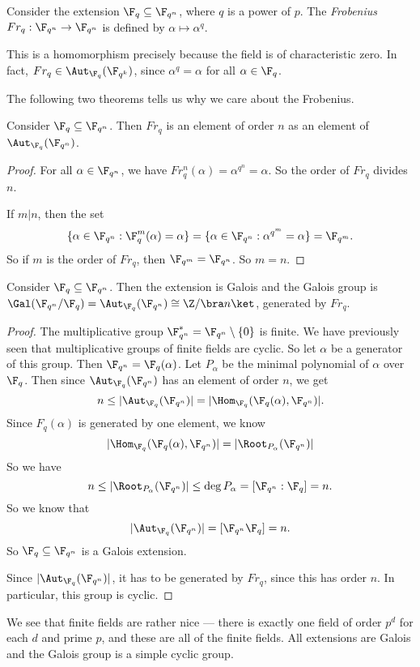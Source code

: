 \documentclass[a4paper]{article}
\begin{document}
\begin{defi}
  Consider the extension $\F_q \subseteq \F_{q^n}$, where $q$ is a power of $p$. The \emph{Frobenius} $Fr_q: \F_{q^n} \to \F_{q^n}$ is defined by $\alpha\mapsto \alpha^q$.
\end{defi}
This is a homomorphism precisely because the field is of characteristic zero. In fact, $Fr_q \in \Aut_{\F_q} (\F_{q^k})$, since $\alpha^q = \alpha$ for all $\alpha \in \F_q$.

The following two theorems tells us why we care about the Frobenius.
\begin{thm}[]
  Consider $\F_q \subseteq \F_{q^n}$. Then $Fr_q$ is an element of order $n$ as an element of $\Aut_{\F_q}(\F_{q^n})$.
\end{thm}

\begin{proof}
  For all $\alpha \in \F_{q^n}$, we have $Fr_q^n (\alpha) = \alpha^{q^n} = \alpha$. So the order of $Fr_q$ divides $n$.

  If $m | n$, then the set
  \[
    \{\alpha \in \F_{q^n} : \F_q^m (\alpha) = \alpha\} = \{\alpha \in \F_{q^n}: \alpha^{q^m} = \alpha\} = \F_{q^m}.
  \]
  So if $m$ is the order of $Fr_q$, then $\F_{q^m} = \F_{q^n}$. So $m = n$.
\end{proof}

\begin{thm}[]
  Consider $\F_q \subseteq \F_{q^n}$. Then the extension is Galois and the Galois group is $\Gal(\F_{q^n}/\F_q) = \Aut_{\F_q}(\F_{q^n}) \cong \Z/\bra n\ket$, generated by $Fr_q$.
\end{thm}

\begin{proof}
  The multiplicative group $\F_{q^n}^* = \F_{q^n} \setminus \{0\}$ is finite. We have previously seen that multiplicative groups of finite fields are cyclic. So let $\alpha$ be a generator of this group. Then $\F_{q^n} = \F_q(\alpha)$. Let $P_\alpha$ be the minimal polynomial of $\alpha$ over $\F_q$. Then since $\Aut_{\F_q}(\F_{q^n})$ has an element of order $n$, we get
  \[
    n \leq |\Aut_{\F_q}(\F_{q^n})| = |\Hom_{\F_q}(\F_q(\alpha), \F_{q^n})|.
  \]
  Since $F_q(\alpha)$ is generated by one element, we know
  \[
    |\Hom_{\F_q}(\F_q(\alpha), \F_{q^n})| = |\Root_{P_\alpha}(\F_{q^n})|
  \]
  So we have
  \[
    n \leq |\Root_{P_\alpha}(\F_{q^n})| \leq \deg P_\alpha = [\F_{q^n}: \F_q] = n.
  \]
  So we know that
  \[
    |\Aut_{\F_q}(\F_{q^n})| = [\F_{q^n} \F_q] = n.
  \]
  So $\F_q \subseteq \F_{q^n}$ is a Galois extension.

  Since $|\Aut_{\F_q}(\F_{q^n})|$, it has to be generated by $Fr_q$, since this has order $n$. In particular, this group is cyclic.
\end{proof}
We see that finite fields are rather nice --- there is exactly one field of order $p^d$ for each $d$ and prime $p$, and these are all of the finite fields. All extensions are Galois and the Galois group is a simple cyclic group.
\end{document}
